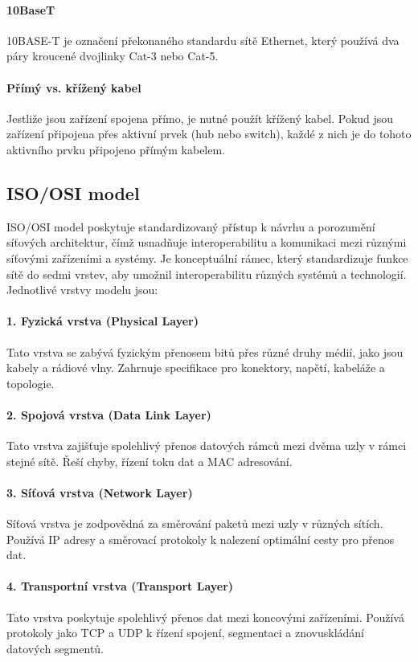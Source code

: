 \paragraph{10BaseT}
10BASE-T je označení překonaného standardu sítě Ethernet, který používá dva páry kroucené dvojlinky Cat-3 nebo Cat-5.

\paragraph{Přímý vs. křížený kabel}
Jestliže jsou zařízení spojena přímo, je nutné použít křížený kabel. Pokud jsou zařízení připojena přes aktivní prvek (hub nebo switch), každé z nich je do tohoto aktivního prvku připojeno přímým kabelem.
\subsection{ISO/OSI model}
ISO/OSI model poskytuje standardizovaný přístup k návrhu a porozumění síťových architektur, čímž usnadňuje interoperabilitu a komunikaci mezi různými síťovými zařízeními a systémy. Je konceptuální rámec, který standardizuje funkce sítě do sedmi vrstev, aby umožnil interoperabilitu různých systémů a technologií. Jednotlivé vrstvy modelu jsou:

\paragraph{1. Fyzická vrstva (Physical Layer)} Tato vrstva se zabývá fyzickým přenosem bitů přes různé druhy médií, jako jsou kabely a rádiové vlny. Zahrnuje specifikace pro konektory, napětí, kabeláže a topologie.

\paragraph{2. Spojová vrstva (Data Link Layer)} Tato vrstva zajišťuje spolehlivý přenos datových rámců mezi dvěma uzly v rámci stejné sítě. Řeší chyby, řízení toku dat a MAC adresování.

\paragraph{3. Síťová vrstva (Network Layer)} Síťová vrstva je zodpovědná za směrování paketů mezi uzly v různých sítích. Používá IP adresy a směrovací protokoly k nalezení optimální cesty pro přenos dat.

\paragraph{4. Transportní vrstva (Transport Layer)} Tato vrstva poskytuje spolehlivý přenos dat mezi koncovými zařízeními. Používá protokoly jako TCP a UDP k řízení spojení, segmentaci a znovuskládání datových segmentů.

